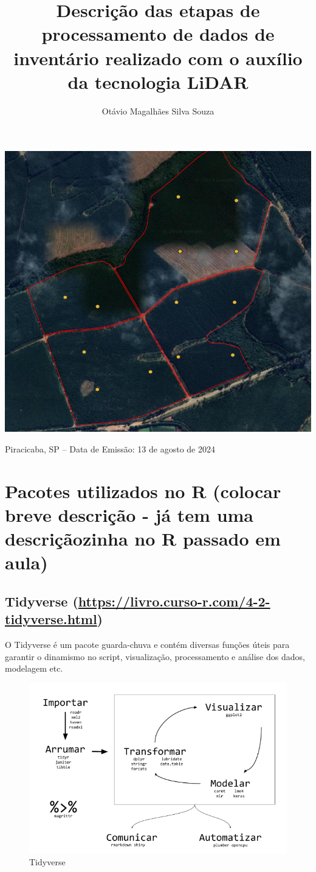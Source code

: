 \documentclass[
]{article}
\title{Descrição das etapas de processamento de dados de inventário
realizado com o auxílio da tecnologia LiDAR}
\author{Otávio Magalhães Silva Souza}
\date{}
\begin{document}
\maketitle

\begin{center}\includegraphics[width=0.4\linewidth]{IMAGES/CAPA} \end{center}

\centerline {Piracicaba, SP – Data de Emissão: 13 de agosto de 2024}
\newpage

\tableofcontents

\newpage

\section{Pacotes utilizados no R (colocar breve descrição - já tem uma
descriçãozinha no R passado em
aula)}\label{pacotes-utilizados-no-r-colocar-breve-descriuxe7uxe3o---juxe1-tem-uma-descriuxe7uxe3ozinha-no-r-passado-em-aula}

\subsection{\texorpdfstring{Tidyverse
(\url{https://livro.curso-r.com/4-2-tidyverse.html})}{Tidyverse (https://livro.curso-r.com/4-2-tidyverse.html)}}\label{tidyverse-httpslivro.curso-r.com4-2-tidyverse.html}

O Tidyverse é um pacote guarda-chuva e contém diversas funções úteis
para garantir o dinamismo no script, visualização, processamento e
análise dos dados, modelagem etc.

\begin{figure}

{\centering \includegraphics[width=0.6\linewidth]{IMAGES/tidyverse} 

}

\caption{Tidyverse}\label{fig:unnamed-chunk-2}
\end{figure}
\end{document}
